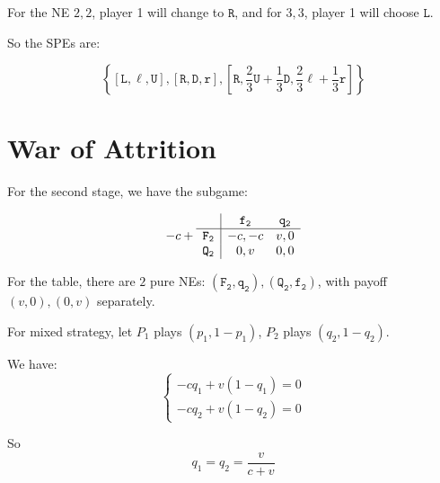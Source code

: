 \documentclass{article}
\begin{document}
    \begin{center}
    \end{center}

    For the NE $2, 2$, player 1 will change to $\mathtt{R}$, and for $3, 3$, player 1 will choose $\mathtt{L}$.

    So the SPEs are:

    $$
    \left\{\left[\mathtt{L}, \ell, \mathtt{U}\right], \left[\mathtt{R}, \mathtt{D}, \mathtt{r}\right], \left[\mathtt{R}, \frac{2}{3}\mathtt{U}+\frac{1}{3}\mathtt{D}, \frac{2}{3}\ell+\frac{1}{3}\mathtt{r}\right]\right\}
    $$

    \section{War of Attrition}

    For the second stage, we have the subgame:

    $$
    -c + \begin{array}{c|c c}
    & \mathtt{f_2} & \mathtt{q_2} \\\hline
    \mathtt{F_2} & -c, -c & v, 0\\
    \mathtt{Q_2} & 0, v & 0, 0
    \end{array}
    $$

    For the table, there are $2$ pure NEs: $(\mathtt{F_2}, \mathtt{q_2}), (\mathtt{Q_2, f_2})$, with payoff $(v, 0), (0, v)$ separately.

    For mixed strategy, let $P_1$ plays $(p_1, 1-p_1)$, $P_2$ plays $(q_2, 1-q_2)$.

    We have:
    $$
    \begin{cases}
        -cq_1+v(1-q_1)=0\\
        -cq_2+v(1-q_2)=0
    \end{cases}
    $$

    So
    $$
    q_1=q_2=\frac{v}{c+v}
    $$
\end{document}
